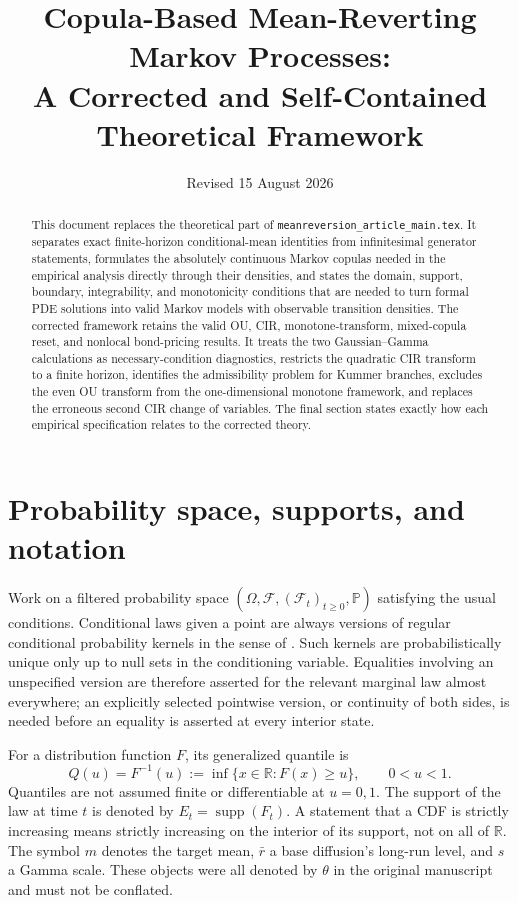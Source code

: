 \documentclass[11pt]{article}
\title{Copula-Based Mean-Reverting Markov Processes:\\A Corrected and Self-Contained Theoretical Framework}
\author{}
\date{Revised 15 August 2026}
\theoremstyle{remark}
\newcommand{\Pp}{\mathbb P}
\newcommand{\R}{\mathbb R}
\newcommand{\supp}{\operatorname{supp}}
\begin{document}
\maketitle

\begin{abstract}
This document replaces the theoretical part of
\texttt{meanreversion\_article\_main.tex}.  It separates exact finite-horizon
conditional-mean identities from infinitesimal generator statements, formulates
the absolutely continuous Markov copulas needed in the empirical analysis
directly through their densities, and states the domain,
support, boundary, integrability, and monotonicity conditions that are needed to
turn formal PDE solutions into valid Markov models with observable transition
densities.  The corrected framework retains the valid OU, CIR, monotone-transform,
mixed-copula reset, and nonlocal bond-pricing results.  It treats the two
Gaussian--Gamma calculations as necessary-condition diagnostics, restricts the
quadratic CIR transform to a finite horizon, identifies the admissibility problem
for Kummer branches, excludes the even OU transform from the one-dimensional
monotone framework, and replaces the erroneous second CIR change of variables.
The final section states exactly how each empirical specification relates to the
corrected theory.
\end{abstract}

\section{Probability space, supports, and notation}

Work on a filtered probability space
$(\Omega,\mathcal F,(\mathcal F_t)_{t\ge0},\Pp)$ satisfying the usual
conditions.  Conditional laws given a point are always versions of regular
conditional probability kernels in the sense of
\citet[Chapter~8]{Kallenberg2021}.  Such kernels are probabilistically unique
only up to null sets in the conditioning variable.  Equalities involving an
unspecified version are therefore asserted for the relevant marginal law almost
everywhere; an explicitly selected pointwise version, or continuity of both
sides, is needed before an equality is asserted at every interior state.

For a distribution function $F$, its generalized quantile is
\begin{equation}
Q(u)=F^{-1}(u):=\inf\{x\in\R:F(x)\ge u\},\qquad 0<u<1.
\label{rev:quantile}
\end{equation}
Quantiles are not assumed finite or differentiable at $u=0,1$.  The support of
the law at time $t$ is denoted by $E_t=\supp(F_t)$.  A statement that a CDF is
strictly increasing means strictly increasing on the interior of its support,
not on all of $\R$.  The symbol $m$ denotes the target mean, $\bar r$ a base
diffusion's long-run level, and $s$ a Gamma scale.  These objects were all denoted
by $\theta$ in the original manuscript and must not be conflated.
\end{document}
